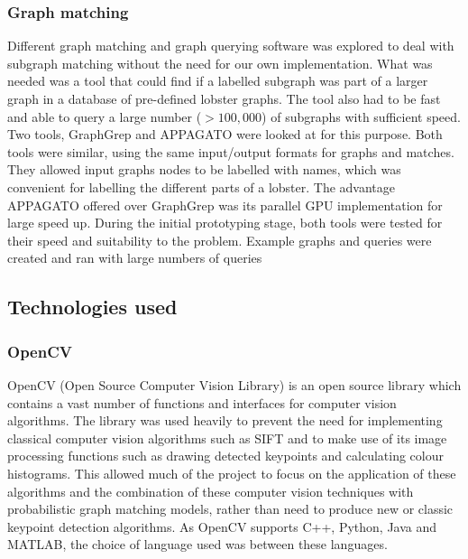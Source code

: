 \subsubsection{Graph matching}
Different graph matching and graph querying software was explored to deal with subgraph matching without the need for our own implementation. What was needed was a tool that could find if a labelled subgraph was part of a larger graph in a database of pre-defined lobster graphs. The tool also had to be fast and able to query a large number ($> 100,000$) of subgraphs with sufficient speed. Two tools, GraphGrep \cite{graphgrep} and APPAGATO \cite{appagato} were looked at for this purpose. 
\n
Both tools were similar, using the same input/output formats for graphs and matches. They allowed input graphs nodes to be labelled with names, which was convenient for labelling the different parts of a lobster. The advantage APPAGATO offered over GraphGrep was its parallel GPU implementation for large speed up. During the initial prototyping stage, both tools were tested for their speed and suitability to the problem. Example graphs and queries were created and ran with large numbers of queries

\subsection{Technologies used}

\subsubsection{OpenCV}
OpenCV (Open Source Computer Vision Library) \cite{opencv} is an open source library which contains a vast number of functions and interfaces for computer vision algorithms. The library was used heavily to prevent the need for implementing classical computer vision algorithms such as SIFT \cite{sift} and to make use of its image processing functions such as drawing detected keypoints and calculating colour histograms. This allowed much of the project to focus on the application of these algorithms and the combination of these computer vision techniques with probabilistic graph matching models, rather than need to produce new or classic keypoint detection algorithms. 
\n
As OpenCV supports C++, Python, Java and MATLAB, the choice of language used was between these languages. 

